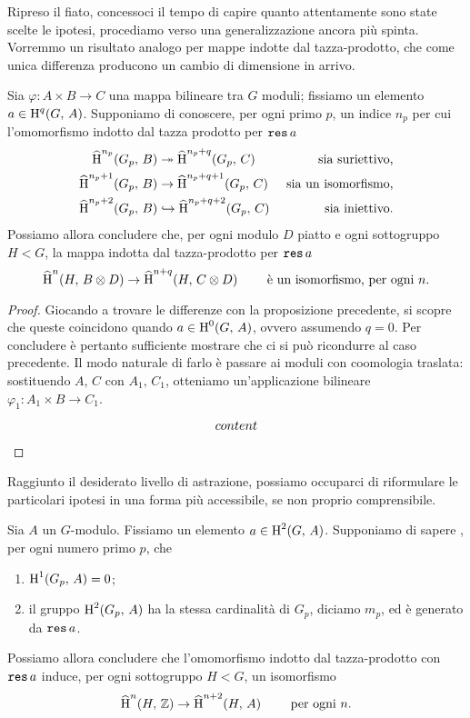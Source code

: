 Ripreso il fiato, concessoci il tempo di capire quanto attentamente sono state scelte le ipotesi, procediamo verso una generalizzazione ancora più spinta. Vorremmo un risultato analogo per mappe indotte dal tazza-prodotto, che come unica differenza producono un cambio di dimensione in arrivo.

\begin{proposition}
	Sia $ \varphi \colon A \times B \to C $ una mappa bilineare tra $ G $ moduli; fissiamo un elemento $ a \in \operatorname{H}^q(G, \, A) $. Supponiamo di conoscere, per ogni primo $ p $, un indice $ n_p $ per cui l'omomorfismo indotto dal tazza prodotto per $ \operatorname{\mathtt{res}} a $
	\begin{align*}
	\operatorname{\widehat{H}}^{n_p}(G_p,\, B) &\twoheadrightarrow \operatorname{\widehat{H}}^{n_p+q}(G_p,\, C) & \text{ sia suriettivo,} \\
	\operatorname{\widehat{H}}^{n_p+1}(G_p,\, B) &\to \operatorname{\widehat{H}}^{n_p+q+1}(G_p,\, C) & \text{ sia un isomorfismo,} \\
	\operatorname{\widehat{H}}^{n_p+2}(G_p,\, B) &\hookrightarrow \operatorname{\widehat{H}}^{n_p+q+2}(G_p,\, C) & \text{ sia iniettivo.}
	\end{align*}
	Possiamo allora concludere che, per ogni modulo $ D $ piatto e ogni sottogruppo $ H < G $, la mappa indotta dal tazza-prodotto per $ \operatorname{\mathtt{res}} a $
	\[ \operatorname{\widehat{H}}^n(H, \, B \otimes D) \to \operatorname{\widehat{H}}^{n+q}(H, \,  C\otimes D) \qquad\text{ è un isomorfismo, per ogni } n. \]
\end{proposition}

\begin{proof}
	Giocando a trovare le differenze con la proposizione precedente, si scopre che queste coincidono quando $ a \in \operatorname{H}^0(G, \, A) $, ovvero assumendo $ q = 0. $ Per concludere è pertanto sufficiente mostrare che ci si può ricondurre al caso precedente. Il modo naturale di farlo è passare ai moduli con coomologia traslata: sostituendo $ A, \, C $ con $ A_1 ,\,  C_1 $, otteniamo un'applicazione bilineare $ \varphi_1\colon A_1 \times B \to C_1 $.
	\[ \begin{tikzcd}
	content
	\end{tikzcd} \]
	
\end{proof}

Raggiunto il desiderato livello di astrazione, possiamo occuparci di riformulare le particolari ipotesi in una forma più accessibile, se non proprio comprensibile.

\begin{theorem}
	Sia $ A $ un $ G $-modulo. Fissiamo un elemento $ a \in \operatorname{H}^2(G, \, A) $. Supponiamo di sapere , per ogni numero primo $ p $, che
	\begin{enumerate}
		\item $ \operatorname{H}^1(G_p, \, A) = 0 $;
		\item il gruppo $ \operatorname{H}^2(G_p, \, A) $ ha la stessa cardinalità di $ G_p $, diciamo $ m_p $, ed è generato da $ \operatorname{\mathtt{res}} a $.
	\end{enumerate}
	Possiamo allora concludere che l'omomorfismo indotto dal tazza-prodotto con $ \operatorname{\mathtt{res}} a $ induce, per ogni sottogruppo $ H < G $, un isomorfismo
	\[ \operatorname{\widehat{H}}^n(H, \, \mathbb{Z}) \to \operatorname{\widehat{H}}^{n+2}(H, \,  A) \qquad \text{ per ogni } n.\]
\end{theorem}

